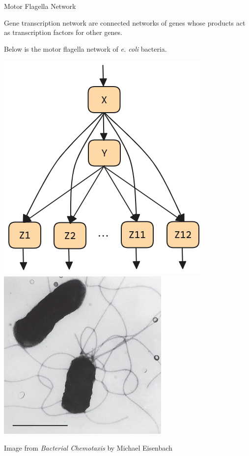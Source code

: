 \documentclass{beamer}
\begin{document}
\begin{frame}{Motor Flagella Network}
    \begin{large}
        Gene transcription network are connected networks of genes whose products act as transcription factors for other genes.

        \vspace*{0.125in}
        Below is the motor flagella network of \textit{e. coli} bacteria.
    \end{large}


    \begin{center}
        \includegraphics[scale=0.25]{multioutput_FFL_color.png}
        \hspace*{0.25in}
        \includegraphics[scale=0.35]{Flagella-of-E-coli-observed-in-transmission-electron-microscope-Bar-1mm_Q320-2724765803.jpg}
    \end{center}

    \begin{footnotesize}
        \hspace*{\fill}Image from \textit{Bacterial Chemotaxis} by Michael Eisenbach
    \end{footnotesize}
\end{frame}
\end{document}

